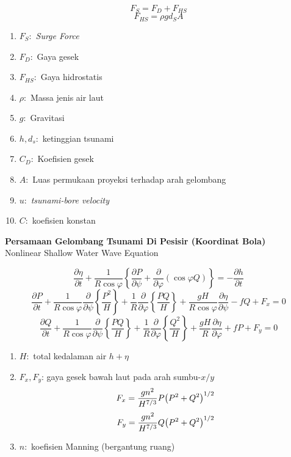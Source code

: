 \documentclass{article}
\begin{document}
\[
F_S = F_D + F_{HS}
\]
\[
F_{HS} = \rho gd_S A
\]
\begin{enumerate}
    \item $F_S:$ \textit{Surge Force}
    \item $F_D:$ Gaya gesek
    \item $F_{HS}:$ Gaya hidrostatis
    \item $\rho:$ Massa jenis air laut
    \item $g:$ Gravitasi
    \item $h,d_s:$ ketinggian tsunami
    \item $C_D:$ Koefisien gesek
    \item $A:$ Luas permukaan proyeksi terhadap arah gelombang
    \item $u:$ \textit{tsunami-bore velocity}
    \item $C:$ koefisien konstan
\end{enumerate}


\begin{center}
    \textbf{Persamaan Gelombang Tsunami Di Pesisir (Koordinat Bola)}\\
    Nonlinear Shallow Water Wave Equation
\end{center}
\begin{equation}
    \frac{\partial \eta}{\partial t} + \frac{1}{R\cos \varphi}\left\{\frac{\partial P}{\partial \psi}+\frac{\partial}{\partial \varphi}(\cos \varphi Q)\right\} = -\frac{\partial h}{\partial t}
\end{equation}
\begin{equation}
    \frac{\partial P}{\partial t} + \frac{1}{R\cos\varphi}\frac{\partial}{\partial \psi}\left\{\frac{P^2}{H}\right\}+\frac{1}{R}\frac{\partial}{\partial\varphi}
    \left\{\frac{PQ}{H}\right\} + \frac{gH}{R\cos\varphi}\frac{\partial\eta}{\partial\psi}-fQ+F_x=0
\end{equation}
\begin{equation}
    \frac{\partial Q}{\partial t} + \frac{1}{R\cos\varphi}\frac{\partial}{\partial \psi}\left\{\frac{PQ}{H}\right\}+\frac{1}{R}\frac{\partial}{\partial\varphi}
    \left\{\frac{Q^2}{H}\right\} + \frac{gH}{R}\frac{\partial\eta}{\partial\varphi}+fP+F_y=0
\end{equation}

\begin{enumerate}
    \item $H:$ total kedalaman air $h+\eta$
    \item $F_x, F_y$: gaya gesek bawah laut pada arah sumbu-$x/y$
    \[
        F_x=\frac{gn^2}{H^{7/3}}P\oio*{P^2+Q^2}^{1/2}
    \]
    \[
        F_y=\frac{gn^2}{H^{7/3}}Q\oio*{P^2+Q^2}^{1/2}
    \]
    \item $n:$ koefisien Manning (bergantung ruang)
\end{enumerate}
\end{document}
